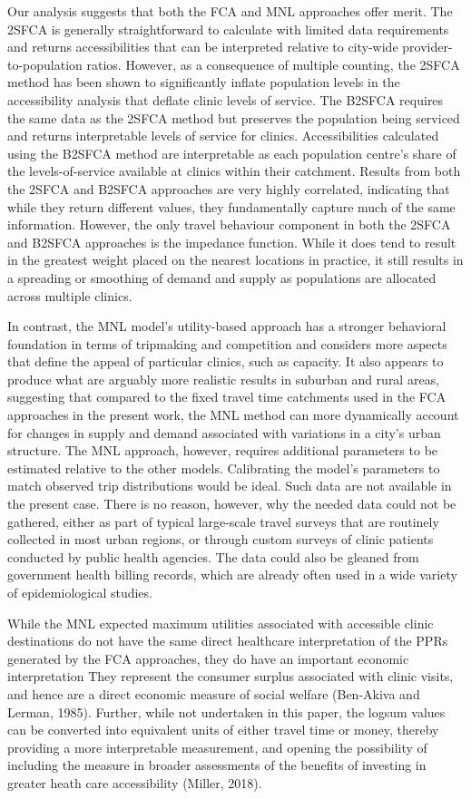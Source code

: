\documentclass[]{elsarticle} %
\begin{document}
Our analysis suggests that both the FCA and MNL approaches offer merit.
The 2SFCA is generally straightforward to calculate with limited data
requirements and returns accessibilities that can be interpreted
relative to city-wide provider-to-population ratios. However, as a
consequence of multiple counting, the 2SFCA method has been shown to
significantly inflate population levels in the accessibility analysis
that deflate clinic levels of service. The B2SFCA requires the same data
as the 2SFCA method but preserves the population being serviced and
returns interpretable levels of service for clinics. Accessibilities
calculated using the B2SFCA method are interpretable as each population
centre's share of the levels-of-service available at clinics within
their catchment. Results from both the 2SFCA and B2SFCA approaches are
very highly correlated, indicating that while they return different
values, they fundamentally capture much of the same information.
However, the only travel behaviour component in both the 2SFCA and
B2SFCA approaches is the impedance function. While it does tend to
result in the greatest weight placed on the nearest locations in
practice, it still results in a spreading or smoothing of demand and
supply as populations are allocated across multiple clinics.

In contrast, the MNL model's utility-based approach has a stronger
behavioral foundation in terms of tripmaking and competition and
considers more aspects that define the appeal of particular clinics,
such as capacity. It also appears to produce what are arguably more
realistic results in suburban and rural areas, suggesting that compared
to the fixed travel time catchments used in the FCA approaches in the
present work, the MNL method can more dynamically account for changes in
supply and demand associated with variations in a city's urban
structure. The MNL approach, however, requires additional parameters to
be estimated relative to the other models. Calibrating the model's
parameters to match observed trip distributions would be ideal. Such
data are not available in the present case. There is no reason, however,
why the needed data could not be gathered, either as part of typical
large-scale travel surveys that are routinely collected in most urban
regions, or through custom surveys of clinic patients conducted by
public health agencies. The data could also be gleaned from government
health billing records, which are already often used in a wide variety
of epidemiological studies.

While the MNL expected maximum utilities associated with accessible
clinic destinations do not have the same direct healthcare
interpretation of the PPRs generated by the FCA approaches, they do have
an important economic interpretation They represent the consumer surplus
associated with clinic visits, and hence are a direct economic measure
of social welfare (Ben-Akiva and Lerman, 1985). Further, while not
undertaken in this paper, the logsum values can be converted into
equivalent units of either travel time or money, thereby providing a
more interpretable measurement, and opening the possibility of including
the measure in broader assessments of the benefits of investing in
greater heath care accessibility (Miller, 2018).
\end{document}
